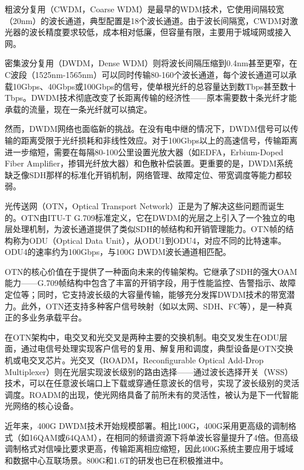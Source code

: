 粗波分复用（CWDM，Coarse WDM）是最早的WDM技术，它使用间隔较宽（20nm）的波长通道，典型配置是18个波长通道。由于波长间隔宽，CWDM对激光器的波长精度要求较低，成本相对低廉，但容量有限，主要用于城域网或接入网。

密集波分复用（DWDM，Dense WDM）则将波长间隔压缩到0.4nm甚至更窄，在C波段（1525nm-1565nm）可以同时传输80-160个波长通道，每个波长通道可以承载10Gbps、40Gbps或100Gbps的信号，使单根光纤的总容量达到数Tbps甚至数十Tbps。DWDM技术彻底改变了长距离传输的经济性——原本需要数十条光纤才能承载的流量，现在一条光纤就可以搞定。

然而，DWDM网络也面临新的挑战。在没有电中继的情况下，DWDM信号可以传输的距离受限于光纤损耗和非线性效应。对于100Gbps以上的高速信号，传输距离进一步缩短，需要在每隔80-100公里设置光放大器（如EDFA，Erbium-Doped Fiber Amplifier，掺铒光纤放大器）和色散补偿装置。更重要的是，DWDM系统缺乏像SDH那样的标准化开销机制，网络管理、故障定位、带宽调度等能力都较弱。

光传送网（OTN，Optical Transport Network）正是为了解决这些问题而诞生的。OTN由ITU-T G.709标准定义，它在DWDM的光层之上引入了一个独立的电层处理机制，为波长通道提供了类似SDH的帧结构和开销管理能力。OTN帧的结构称为ODU（Optical Data Unit），从ODU1到ODU4，对应不同的比特速率。ODU4的速率约为100Gbps，与100G DWDM波长通道相匹配。

OTN的核心价值在于提供了一种面向未来的传输架构。它继承了SDH的强大OAM能力——G.709帧结构中包含了丰富的开销字段，用于性能监控、告警指示、故障定位等；同时，它支持波长级的大容量传输，能够充分发挥DWDM技术的带宽潜力。此外，OTN还支持多种客户信号映射（如以太网、SDH、FC等），是一种真正的多业务承载平台。

在OTN架构中，电交叉和光交叉是两种主要的交换机制。电交叉发生在ODU层面，通过电信号处理实现客户信号的复用、解复用和调度，典型设备是OTN交换机或电交叉芯片。光交叉（ROADM，Reconfigurable Optical Add-Drop Multiplexer）则在光层实现波长级别的路由选择——通过波长选择开关（WSS）技术，可以在任意波长端口上下载或穿通任意波长的信号，实现了波长级别的灵活调度。ROADM的出现，使光网络具备了前所未有的灵活性，被认为是下一代智能光网络的核心设备。

近年来，400G DWDM技术开始规模部署。相比100G，400G采用更高级的调制格式（如16QAM或64QAM），在相同的频谱资源下将单波长容量提升了4倍。但高级调制格式对信噪比要求更高，传输距离相应缩短，因此400G系统主要应用于城域和数据中心互联场景。800G和1.6T的研发也已在积极推进中。

